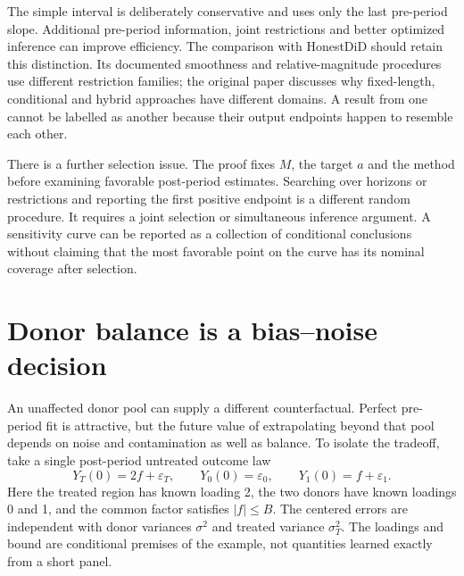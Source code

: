 The simple interval is deliberately conservative and uses only the last
pre-period slope. Additional pre-period information, joint restrictions and
better optimized inference can improve efficiency. The comparison with
HonestDiD should retain this distinction. Its documented smoothness and
relative-magnitude procedures use different restriction families; the original
paper discusses why fixed-length, conditional and hybrid approaches have
different domains. A result from one cannot be labelled as another because
their output endpoints happen to resemble each other.~\citep{rambachan2023,sw_honestdid}

There is a further selection issue. The proof fixes $M$, the target $a$
and the method before examining favorable post-period estimates. Searching
over horizons or restrictions and reporting the first positive endpoint is
a different random procedure. It requires a joint selection or simultaneous
inference argument. A sensitivity curve can be reported as a collection of
conditional conclusions without claiming that the most favorable point on
the curve has its nominal coverage after selection.

\section{Donor balance is a bias--noise decision}
\label{exec17:s6-donor}

An unaffected donor pool can supply a different counterfactual. Perfect
pre-period fit is attractive, but the future value of extrapolating beyond
that pool depends on noise and contamination as well as balance. To isolate
the tradeoff, take a single post-period untreated outcome law
\begin{equation}
 Y_T(0)=2f+\varepsilon_T,\qquad
 Y_0(0)=\varepsilon_0,\qquad
 Y_1(0)=f+\varepsilon_1.
 \label{exec17:s6-donor-law}
\end{equation}
Here the treated region has known loading 2, the two donors have known
loadings 0 and 1, and the common factor satisfies $|f|\leq B$.
The centered errors are independent with donor variances $\sigma^2$
and treated variance $\sigma_T^2$. The loadings and bound are conditional
premises of the example, not quantities learned exactly from a short panel.

